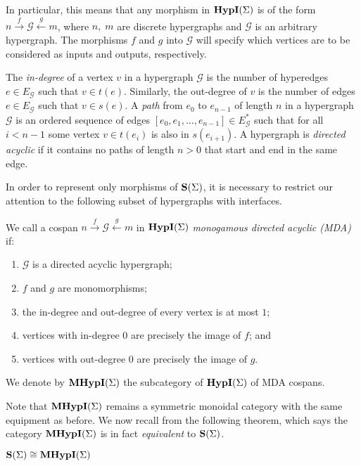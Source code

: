 In particular, this means that any morphism in $\textbf{HypI}(\Sigma)$ is of the form $n \xrightarrow{f} \mathcal{G} \xleftarrow{g} m$,
where $n,\;m$ are discrete hypergraphs and $\mathcal{G}$ is an arbitrary hypergraph.  The morphisms $f$ and $g$ into $\mathcal{G}$ will specify which vertices are to be considered as inputs and outputs,  respectively.   

\begin{definition} 
The \emph{in-degree} of a vertex $v$ in a hypergraph $\mathcal{G}$ is the number of hyperedges $e \in {E_\mathcal{G}}$ such that $v \in t(e)$.  
Similarly, the out-degree of $v$ is the number of edges $e \in E_\mathcal{G}$ such that $v \in s(e)$.
A \emph{path} from $e_0$ to $e_{n-1}$ of length $n$ in a hypergraph $\mathcal{G}$ is an ordered sequence of edges $[e_0, e_1, \ldots, e_{n-1}] \in E_\mathcal{G}^*$ such that for all $i < n - 1$ some vertex $v \in t(e_i)$ is also in $s(e_{i+1})$.
A hypergraph is \emph{directed acyclic} if it contains no paths of length $n > 0$ that start and end in the same edge.
\end{definition}

In order to represent only morphisms of $\mathbf{S}(\Sigma)$,  it is necessary to restrict our attention to the following subset of hypergraphs with interfaces. 
\begin{definition}
\label{def:monogamy_hyp}
We call a cospan $n \xrightarrow{f} \mathcal{G} \xleftarrow{g} m$ in $\textbf{HypI}(\Sigma)$ \emph{monogamous directed acyclic (MDA)} if:
\begin{enumerate}
    \item $\mathcal{G}$ is a directed acyclic hypergraph;
    \item $f$ and $g$ are monomorphisms;
    \item the in-degree and out-degree of every vertex is at most $1$;
    \item vertices with in-degree $0$ are precisely the image of $f$; and
    \item vertices with out-degree $0$ are precisely the image of $g$.
\end{enumerate}
We denote by $\textbf{MHypI}(\Sigma)$ the subcategory of $\textbf{HypI}(\Sigma)$ of MDA cospans.
\end{definition}
Note that $\textbf{MHypI}(\Sigma)$ remains a symmetric monoidal category with the same equipment as before.  We now recall from
\cite{bonchi_string_2022-2} the following theorem,  which says the category $\textbf{MHypI}(\Sigma)$ is in fact \textit{equivalent} to $\mathbf{S}(\Sigma)$. 
\begin{theorem}\label{thm:prop-equiv}
    $\mathbf{S}(\Sigma) \cong \textbf{MHypI}(\Sigma)$
\end{theorem}

